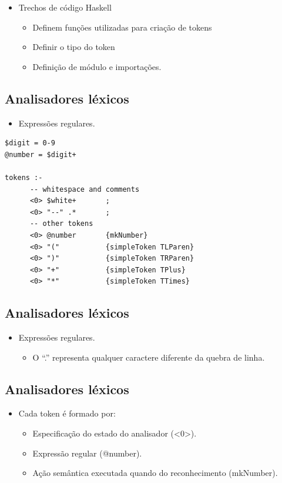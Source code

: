 \documentclass[11pt]{article}
\begin{document}
\begin{itemize}
\item Trechos de código Haskell
\begin{itemize}
\item Definem funções utilizadas para criação de tokens
\item Definir o tipo do token
\item Definição de módulo e importações.
\end{itemize}
\end{itemize}
\subsection*{Analisadores léxicos}
\label{sec:org800f629}

\begin{itemize}
\item Expressões regulares.
\end{itemize}

\begin{verbatim}
$digit = 0-9
@number = $digit+

tokens :-
      -- whitespace and comments
      <0> $white+       ;
      <0> "--" .*       ;
      -- other tokens
      <0> @number       {mkNumber}
      <0> "("           {simpleToken TLParen}
      <0> ")"           {simpleToken TRParen}
      <0> "+"           {simpleToken TPlus}
      <0> "*"           {simpleToken TTimes}
\end{verbatim}
\subsection*{Analisadores léxicos}
\label{sec:org40172ce}

\begin{itemize}
\item Expressões regulares.
\begin{itemize}
\item O ``.'' representa qualquer caractere diferente da quebra de linha.
\end{itemize}
\end{itemize}
\subsection*{Analisadores léxicos}
\label{sec:orgf5530f3}

\begin{itemize}
\item Cada token é formado por:
\begin{itemize}
\item Especificação do estado do analisador (<0>).
\item Expressão regular (@number).
\item Ação semântica executada quando do reconhecimento (mkNumber).
\end{itemize}
\end{itemize}
\end{document}
